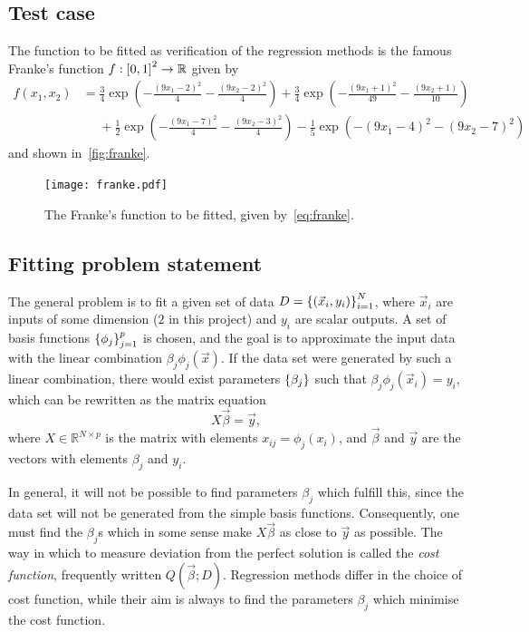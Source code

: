 \documentclass[11pt,british,a4paper]{article}
\let\oldexp=\exp
\renewcommand{\exp}[1]{\mathrm{e}^{#1}}
\numberwithin{equation}{section}
\begin{document}
\subsection{Test case}
The function to be fitted as verification of the regression methods is the famous Franke's function \(f:\qty[0,1]^2\to\mathbb{R}\) given by
\begin{equation}
    \begin{alignedat}{2}
        f(x_1,x_2) &= \frac{3}{4}\oldexp(-\frac{(9x_1-2)^2}{4} - \frac{(9x_2-2)^2}{4})
                + \frac{3}{4}\oldexp(-\frac{(9x_1+1)^2}{49}- \frac{(9x_2+1)}{10} ) \\
               &\phantom{{}={}}+ \frac{1}{2}\oldexp(-\frac{(9x_1-7)^2}{4} - \frac{(9x_2-3)^2}{4})
                - \frac{1}{5}\oldexp(-(9x_1-4)^2 - (9x_2-7)^2)
    \end{alignedat}\label{eq:franke}
\end{equation}
and shown in~\vref{fig:franke}.

\begin{figure}[H]
    \centering
    \texttt{[image: franke.pdf]}
    \caption{The Franke's function to be fitted, given by~\vref{eq:franke}.}\label{fig:franke}
\end{figure}

\subsection{Fitting problem statement}
The general problem is to fit a given set of data \(D=\qty{(\vec{x}_i,y_i)}_{i=1}^N\), where \(\vec{x}_i\) are inputs of some dimension (\(2\) in this project) and \(y_i\) are scalar outputs.
A set of basis functions \(\qty{\phi_j}_{j=1}^p\) is chosen, and the goal is to approximate the input data with the linear combination \(\beta_j \phi_j(\vec{x})\).
If the data set were generated by such a linear combination, there would exist parameters \(\qty{\beta_j}\) such that \(\beta_j\phi_j(\vec{x}_i)=y_i\), which can be rewritten as the matrix equation
\begin{equation}
    X\vec{\beta} = \vec{y},
\end{equation}
where \(X\in\mathbb{R}^{N\times p}\) is the matrix with elements \(x_{ij}=\phi_j(x_i)\), and \(\vec{\beta}\) and \(\vec{y}\) are the vectors with elements \(\beta_j\) and \(y_i\).

In general, it will not be possible to find parameters \(\beta_j\) which fulfill this, since the data set will not be generated from the simple basis functions.
Consequently, one must find the \(\beta_j\)s which in some sense make \(X\vec{\beta}\) as close to \(\vec{y}\) as possible.
The way in which to measure deviation from the perfect solution is called the \emph{cost function}, frequently written \(Q(\vec{\beta};D)\).
Regression methods differ in the choice of cost function, while their aim is always to find the parameters \(\beta_j\) which minimise the cost function.
\end{document}

